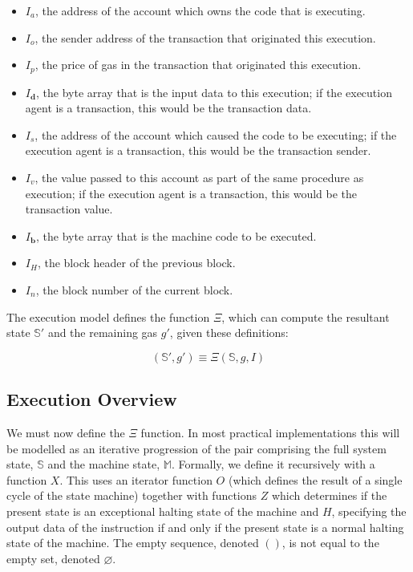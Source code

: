 \documentclass[9pt,oneside]{amsart}
\begin{document}
\begin{multicols}{2}
\begin{itemize}
\item $I_a$, the address of the account which owns the code that is executing.
\item $I_o$, the sender address of the transaction that originated this execution.
\item $I_p$, the price of gas in the transaction that originated this execution.
\item $I_\mathbf{d}$, the byte array that is the input data to this execution; if the execution agent is a transaction, this would be the transaction data.
\item $I_s$, the address of the account which caused the code to be executing; if the execution agent is a transaction, this would be the transaction sender.
\item $I_v$, the value passed to this account as part of the same procedure as execution; if the execution agent is a transaction, this would be the transaction value.
\item $I_\mathbf{b}$, the byte array that is the machine code to be executed.
\item $I_H$, the block header of the previous block.
\item $I_n$, the block number of the current block.
\end{itemize}

The execution model defines the function $\Xi$, which can compute the resultant state $\mathbb{S}'$ and the remaining gas $g'$, given these definitions:

\begin{equation}
(\mathbb{S}', g') \equiv \Xi(\mathbb{S}, g, I)
\end{equation}

\subsection{Execution Overview}

We must now define the $\Xi$ function. In most practical implementations this will be modelled as an iterative progression of the pair comprising the full system state, $\mathbb{S}$ and the machine state, $\mathbb{M}$. Formally, we define it recursively with a function $X$. This uses an iterator function $O$ (which defines the result of a single cycle of the state machine) together with functions $Z$ which determines if the present state is an exceptional halting state of the machine and $H$, specifying the output data of the instruction if and only if the present state is a normal halting state of the machine. The empty sequence, denoted $()$, is not equal to the empty set, denoted $\varnothing$.


\end{multicols}
\end{document}
